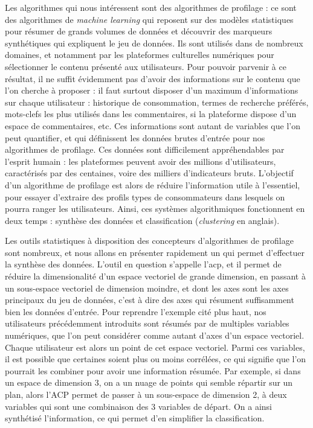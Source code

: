 \documentclass[a4paper,12pt]{report}
\begin{document}
Les algorithmes qui nous intéressent sont des algorithmes de profilage : ce sont des algorithmes de \textit{machine learning} qui reposent sur des modèles statistiques pour résumer de grands volumes de données et découvrir des marqueurs synthétiques qui expliquent le jeu de données. Ils sont utilisés dans de nombreux domaines, et notamment par les plateformes culturelles numériques pour sélectionner le contenu présenté aux utilisateurs. Pour pouvoir parvenir à ce résultat, il ne suffit évidemment pas d'avoir des informations sur le contenu que l'on cherche à proposer : il faut surtout disposer d'un maximum d'informations sur chaque utilisateur : historique de consommation, termes de recherche préférés, mots-clefs les plus utilisés dans les commentaires, si la plateforme dispose d'un espace de commentaires, etc. Ces informations sont autant de variables que l'on peut quantifier, et qui définissent les données brutes d'entrée pour nos algorithmes de profilage. Ces données sont difficilement appréhendables par l'esprit humain : les plateformes peuvent avoir des millions d'utilisateurs, caractérisés par des centaines, voire des milliers d'indicateurs bruts. L'objectif d'un algorithme de profilage est alors de réduire l'information utile à l'essentiel, pour essayer d'extraire des profils types de consommateurs dans lesquels on pourra ranger les utilisateurs. Ainsi, ces systèmes algorithmiques fonctionnent en deux temps : synthèse des données et classification (\textit{clustering} en anglais).

Les outils statistiques à disposition des concepteurs d'algorithmes de profilage sont nombreux, et nous allons en présenter rapidement un qui permet d'effectuer la synthèse des données. L'outil en question s'appelle l'\gls{acp}, et il permet de réduire la dimensionalité d'un espace vectoriel de grande dimension, en passant à un sous-espace vectoriel de dimension moindre, et dont les axes sont les axes principaux du jeu de données, c'est à dire des axes qui résument suffisamment bien les données d'entrée. Pour reprendre l'exemple cité plus haut, nos utilisateurs précédemment introduits sont résumés par de multiples variables numériques, que l'on peut considérer comme autant d'axes d'un espace vectoriel. Chaque utilisateur est alors un point de cet espace vectoriel. Parmi ces variables, il est possible que certaines soient plus ou moins corrélées, ce qui signifie que l'on pourrait les combiner pour avoir une information résumée. Par exemple, si dans un espace de dimension 3, on a un nuage de points qui semble répartir sur un plan, alors l'ACP permet de passer à un sous-espace de dimension 2, à deux variables qui sont une combinaison des 3 variables de départ. On a ainsi synthétisé l'information, ce qui permet d'en simplifier la classification.
\end{document}
